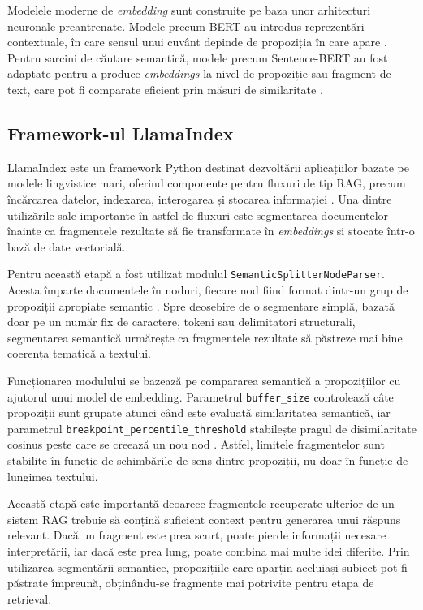 \documentclass[12pt, a4paper, oneside, romanian]{teza-upb}
\begin{document}
Modelele moderne de \textit{embedding} sunt construite pe baza unor arhitecturi neuronale preantrenate. Modele precum BERT au introdus reprezentări contextuale, în care sensul unui cuvânt depinde de propoziția în care apare \cite{devlin2018bert}. Pentru sarcini de căutare semantică, modele precum Sentence-BERT au fost adaptate pentru a produce \textit{embeddings} la nivel de propoziție sau fragment de text, care pot fi comparate eficient prin măsuri de similaritate \cite{reimers2019sbert}.


\subsection{Framework-ul LlamaIndex}

LlamaIndex este un framework Python destinat dezvoltării aplicațiilor bazate pe modele lingvistice mari, oferind componente pentru fluxuri de tip RAG, precum încărcarea datelor, indexarea, interogarea și stocarea informației \cite{llamaindex_doc}. Una dintre utilizările sale importante în astfel de fluxuri este segmentarea documentelor înainte ca fragmentele rezultate să fie transformate în \textit{embeddings} și stocate într-o bază de date vectorială.

Pentru această etapă a fost utilizat modulul \texttt{SemanticSplitterNodeParser}. Acesta împarte documentele în noduri, fiecare nod fiind format dintr-un grup de propoziții apropiate semantic \cite{llamaindex_semantic_splitter}. Spre deosebire de o segmentare simplă, bazată doar pe un număr fix de caractere, tokeni sau delimitatori structurali, segmentarea semantică urmărește ca fragmentele rezultate să păstreze mai bine coerența tematică a textului.

Funcționarea modulului se bazează pe compararea semantică a propozițiilor cu ajutorul unui model de embedding. Parametrul \texttt{buffer\_size} controlează câte propoziții sunt grupate atunci când este evaluată similaritatea semantică, iar parametrul \texttt{breakpoint\_percentile\_threshold} stabilește pragul de disimilaritate cosinus peste care se creează un nou nod \cite{llamaindex_semantic_splitter}. Astfel, limitele fragmentelor sunt stabilite în funcție de schimbările de sens dintre propoziții, nu doar în funcție de lungimea textului.

Această etapă este importantă deoarece fragmentele recuperate ulterior de un sistem RAG trebuie să conțină suficient context pentru generarea unui răspuns relevant. Dacă un fragment este prea scurt, poate pierde informații necesare interpretării, iar dacă este prea lung, poate combina mai multe idei diferite. Prin utilizarea segmentării semantice, propozițiile care aparțin aceluiași subiect pot fi păstrate împreună, obținându-se fragmente mai potrivite pentru etapa de retrieval.
\end{document}
